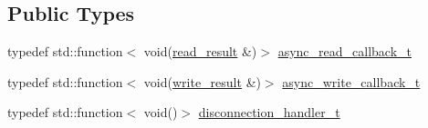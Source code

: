 \subsection*{Public Types}
\begin{DoxyCompactItemize}
\item 
typedef std\+::function$<$ void(\mbox{\hyperlink{structcpp__redis_1_1network_1_1tcp__client__iface_1_1read__result}{read\+\_\+result}} \&)$>$ \mbox{\hyperlink{classcpp__redis_1_1network_1_1tcp__client__iface_ae8bf79e8e1f1d7e359ed1c7cdc4026fc}{async\+\_\+read\+\_\+callback\+\_\+t}}
\item 
typedef std\+::function$<$ void(\mbox{\hyperlink{structcpp__redis_1_1network_1_1tcp__client__iface_1_1write__result}{write\+\_\+result}} \&)$>$ \mbox{\hyperlink{classcpp__redis_1_1network_1_1tcp__client__iface_a1dc52ccc70cf377c4fbb495a16adc658}{async\+\_\+write\+\_\+callback\+\_\+t}}
\item 
typedef std\+::function$<$ void()$>$ \mbox{\hyperlink{classcpp__redis_1_1network_1_1tcp__client__iface_a9a7d5942205db8be03da581a848b8ec0}{disconnection\+\_\+handler\+\_\+t}}
\end{DoxyCompactItemize}
